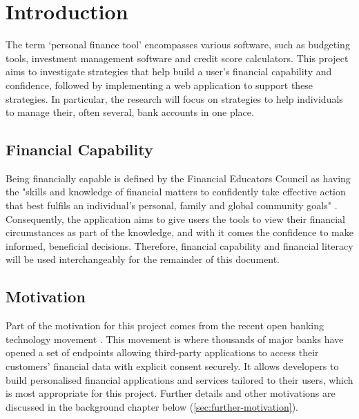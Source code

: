 \chapter{Introduction}
\label{ch:introduction}

The term `personal finance tool' encompasses various software, such as budgeting tools, investment management software and credit score calculators. This project aims to investigate strategies that help build a user's financial capability and confidence, followed by implementing a web application to support these strategies. In particular, the research will focus on strategies to help individuals to manage their, often several, bank accounts in one place.

\section{Financial Capability}
Being financially capable is defined by the Financial Educators Council as having the "skills and knowledge of financial matters to confidently take effective action that best fulfils an individual's personal, family and global community goals" \cite{FinancialEducatorsCouncil}. Consequently, the application aims to give users the tools to view their financial circumstances as part of the knowledge, and with it comes the confidence to make informed, beneficial decisions. Therefore, financial capability and financial literacy will be used interchangeably for the remainder of this document.

\section{Motivation}
Part of the motivation for this project comes from the recent open banking technology movement \cite{OpenBanking}. This movement is where thousands of major banks have opened a set of endpoints allowing third-party applications to access their customers' financial data with explicit consent securely. It allows developers to build personalised financial applications and services tailored to their users, which is most appropriate for this project. Further details and other motivations are discussed in the background chapter below (\ref{sec:further-motivation}).







